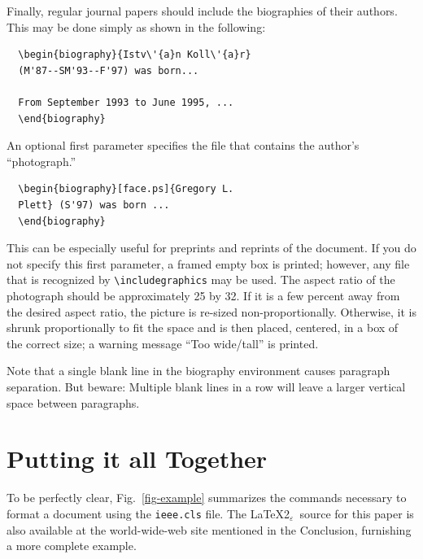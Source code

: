 \documentclass[%
	final,
	notitlepage,
	narroweqnarray,
	inline,
	twoside,
	]{ieee}
\newcommand{\latexiie}{\LaTeX2{\Large$_\varepsilon$}}
\begin{document}
Finally, regular journal papers should include the biographies of
their authors.  This may be done simply as shown in the following:
\begin{verbatim}
  \begin{biography}{Istv\'{a}n Koll\'{a}r} 
  (M'87--SM'93--F'97) was born...

  From September 1993 to June 1995, ... 
  \end{biography}
\end{verbatim}
An optional first parameter specifies the file that contains the 
author's ``photograph.''
\begin{verbatim}
  \begin{biography}[face.ps]{Gregory L. 
  Plett} (S'97) was born ...
  \end{biography}
\end{verbatim}
This can be especially useful for preprints and reprints of the
document.  If you do not specify this first parameter, a framed empty
box is printed; however, any file that is recognized by
\verb|\includegraphics| may be used.  The aspect ratio of the
photograph should be approximately 25 by 32.  If it is a few percent
away from the desired aspect ratio, the picture is re-sized
non-proportionally.  Otherwise, it is shrunk proportionally to fit the
space and is then placed, centered, in a box of the correct size; a
warning message ``Too wide/tall'' is printed.

Note that a single blank line in the biography environment causes
paragraph separation. But beware: Multiple blank lines in a row will
leave a larger vertical space between paragraphs.

\section{Putting it all Together}

To be perfectly clear, Fig.~\ref{fig-example} summarizes the commands
necessary to format a document using the \texttt{ieee.cls} file. The
\latexiie\ source for this paper is also available at the
world-wide-web site mentioned in the Conclusion, furnishing a more
complete example.
\end{document}
